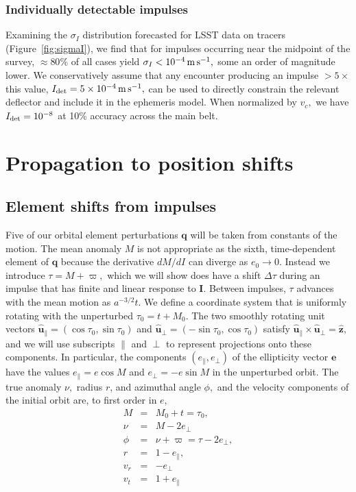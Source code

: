 \documentclass[linenumbers, onecolumn]{aastex631}
\newcommand{\vecI}{\mathbf{I}}
\newcommand{\vece}{\mathbf{e}}
\newcommand{\uhat}{\boldsymbol{\hat u}}
\newcommand{\zhat}{\mathbf{\hat z}}
\newcommand{\vecq}{\mathbf{q}}
\newcommand{\lop}{\varpi}
\begin{document}
\subsubsection{Individually detectable impulses}
Examining the $\sigma_I$ distribution forecasted for LSST data on tracers (Figure~\ref{fig:sigmaI}), we find that for impulses occurring near the midpoint of the survey, $\approx80\%$ of all cases yield $\sigma_I<10^{-4}\,{\rm m}\,{\rm
  s}^{-1},$ some an order of magnitude lower.  We conservatively
assume that any encounter producing  an impulse $>5\times$ this value, $I_{\rm det}=5\times 10^{-4}\,{\rm m}\,{\rm
  s}^{-1},$ can be used to directly constrain the relevant deflector and include it in the ephemeris model.
When normalized by $v_c,$ we have $I_{\rm  det}=10^{-8}$ at 10\% accuracy across the main belt.

\section{Propagation to position shifts}
\label{sec:propagation}

\subsection{Element shifts from impulses}
\label{sec:elements}

Five of our orbital element perturbations $\vecq$ will be taken from constants of the motion.  The mean anomaly $M$ is not appropriate as the sixth, time-dependent element of $\vecq$ because the derivative $dM/dI$ can diverge as $e_0\rightarrow 0.$ Instead we introduce $\tau = M+\lop,$ which we will show does have a shift $\Delta\tau$ during an impulse that has finite and linear response to $\vecI$.  Between impulses, $\tau$ advances with the mean motion as $a^{-3/2}t.$  We define a coordinate system that is uniformly rotating with the unperturbed $\tau_0=t+M_0.$ The two smoothly rotating unit vectors $\uhat_\parallel=(\cos \tau_0, \sin \tau_0)$ and
$\uhat_\perp=(-\sin \tau_0, \cos \tau_0)$ satisfy $\uhat_\parallel
\times \uhat_\perp = \zhat,$ and we will use subscripts $\parallel$
and $\perp$ to represent projections onto these components.  In
particular, the components $(e_\parallel,e_\perp)$ of the ellipticity
vector $\vece$ have the values $e_\parallel=e\cos M$ and $e_\perp=-e\sin M$ in the unperturbed orbit.
The true anomaly $\nu,$ radius $r$, and azimuthal angle $\phi,$ and
the velocity components of the initial orbit are, to first order in $e$,
\begin{eqnarray}
  M & = & M_0 + t = \tau_0,  \nonumber \\
  \nu & = & M - 2 e_\perp \nonumber \\
  \phi & = & \nu + \lop = \tau - 2e_\perp, \nonumber\\
  r & = & 1-e_\parallel, \nonumber \\
  v_r & = & -e_\perp \nonumber \\
  v_t & = & 1 + e_\parallel
            \label{eq:kepler}
\end{eqnarray}
\end{document}
